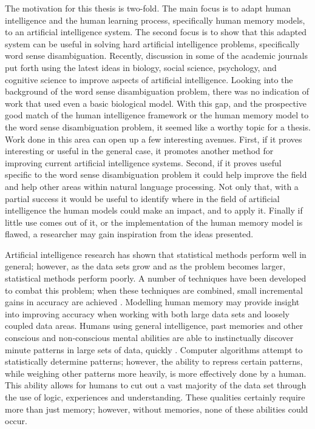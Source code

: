 The motivation for this thesis is two-fold.  The main focus is to adapt human intelligence and the human learning process, specifically human memory models, to an artificial intelligence system.  The second focus is to show that this adapted system can be useful in solving hard artificial intelligence problems, specifically word sense disambiguation.  Recently, discussion in some of the academic journals put forth using the latest ideas in biology, social science, psychology, and cognitive science to improve aspects of artificial intelligence.  Looking into the background of the word sense disambiguation problem, there was no indication of work that used even a basic biological model. With this gap, and the prospective good match of the human intelligence framework or the human memory model to the word sense disambiguation problem, it seemed like a worthy topic for a thesis.  Work done in this area can open up a few interesting avenues. First, if it proves interesting or useful in the general case, it promotes another method for improving current artificial intelligence systems. Second, if it proves useful specific to the word sense disambiguation problem it could help improve the field and help other areas within natural language processing.  Not only that, with a partial success it would be useful to identify where in the field of artificial intelligence the human models could make an impact, and to apply it.  Finally if little use comes out of it, or the implementation of the human memory model is flawed, a researcher may gain inspiration from the ideas presented.

Artificial intelligence research has shown that statistical methods perform well in general; however, as the data sets grow and as the problem becomes larger, statistical methods perform poorly.  A number of techniques have been developed to combat this problem; when these techniques are combined, small incremental gains in accuracy are achieved \cite{ENSEMBLE2}.  Modelling human memory may provide insight into improving accuracy when working with both large data sets and loosely coupled data areas.  Humans using general intelligence, past memories and other conscious and non-conscious mental abilities are able to instinctually discover minute patterns in large sets of data, quickly \cite{BLINK}.  Computer algorithms attempt to statistically determine patterns; however, the ability to repress certain patterns, while weighing other patterns more heavily, is more effectively done by a human.  This ability allows for humans to cut out a vast majority of the data set through the use of logic, experiences and understanding.  These qualities certainly require more than just memory; however, without memories, none of these abilities could occur.

